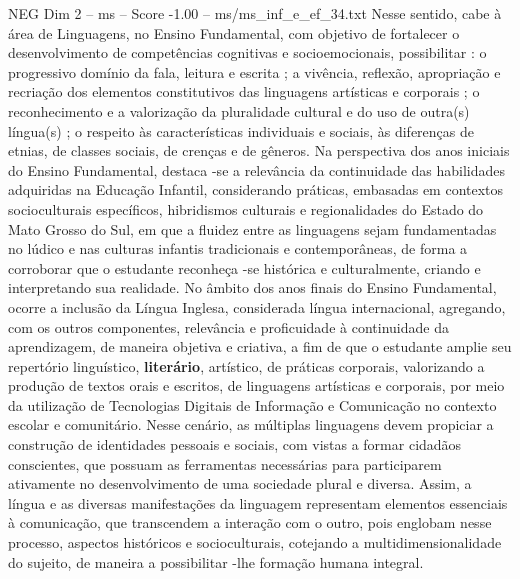 \begin{textsample}{NEG Dim 2 – ms – Score -1.00 – ms/ms\_inf\_e\_ef\_34.txt}
Nesse sentido, cabe à área de Linguagens, no Ensino Fundamental, com objetivo de fortalecer o desenvolvimento de competências cognitivas e socioemocionais, possibilitar : o progressivo domínio da fala, leitura e escrita ; a vivência, reflexão, apropriação e recriação dos elementos constitutivos das linguagens artísticas e corporais ; o reconhecimento e a valorização da pluralidade cultural e do uso de outra(s) língua(s) ; o respeito às características individuais e sociais, às diferenças de etnias, de classes sociais, de crenças e de gêneros.
Na perspectiva dos anos iniciais do Ensino Fundamental, destaca -se a relevância da continuidade das habilidades adquiridas na Educação Infantil, considerando práticas, embasadas em contextos socioculturais específicos, hibridismos culturais e regionalidades do Estado do Mato Grosso do Sul, em que a fluidez entre as linguagens sejam fundamentadas no lúdico e nas culturas infantis tradicionais e contemporâneas, de forma a corroborar que o estudante reconheça -se histórica e culturalmente, criando e interpretando sua realidade.
No âmbito dos anos finais do Ensino Fundamental, ocorre a inclusão da Língua Inglesa, considerada língua internacional, agregando, com os outros componentes, relevância e proficuidade à continuidade da aprendizagem, de maneira objetiva e criativa, a fim de que o estudante amplie seu repertório linguístico, \textbf{literário}, artístico, de práticas corporais, valorizando a produção de textos orais e escritos, de linguagens artísticas e corporais, por meio da utilização de Tecnologias Digitais de Informação e Comunicação no contexto escolar e comunitário.
Nesse cenário, as múltiplas linguagens devem propiciar a construção de identidades pessoais e sociais, com vistas a formar cidadãos conscientes, que possuam as ferramentas necessárias para participarem ativamente no desenvolvimento de uma sociedade plural e diversa.
Assim, a língua e as diversas manifestações da linguagem representam elementos essenciais à comunicação, que transcendem a interação com o outro, pois englobam nesse processo, aspectos históricos e socioculturais, cotejando a multidimensionalidade do sujeito, de maneira a possibilitar -lhe formação humana integral.

\end{textsample}
